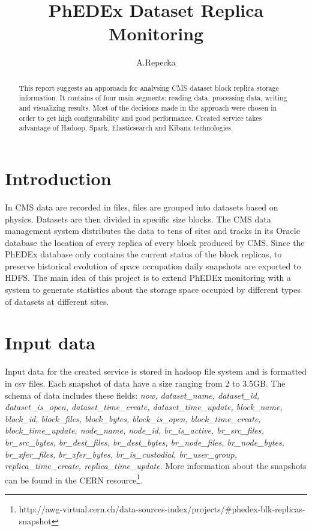 \title{PhEDEx Dataset Replica Monitoring}
\author{A.Repecka}
\maketitle

\begin{abstract}
This report suggests an apporoach for analysing CMS dataset block replica storage information. It contains of four main segments: reading data, 
processing data, writing and visualizing results. Most of the decisions made in the approach were chosen in order to get high configurability and 
good performance. Created service takes advantage of Hadoop, Spark, Elasticsearch and Kibana technologies.
\end{abstract}

\section{Introduction}

In CMS data are recorded in files, files are grouped into datasets based on physics. Datasets are then divided in specific size blocks.
The CMS data management system distributes the data to tens of sites and tracks in its Oracle database the location of every replica of 
every block produced by CMS. Since the PhEDEx database only contains the current status of the block replicas, to preserve historical 
evolution of space occupation daily snapshots are exported to HDFS. The main idea of this project is to extend PhEDEx monitoring with a 
system to generate statistics about the storage space occupied by different types of datasets at different sites.

\section{Input data}

Input data for the created service is stored in hadoop file system and is formatted in csv files. Each snapshot of data have a size ranging 
from 2 to 3.5GB. The schema of data includes these fields:
\textit{now, dataset{\_}name, dataset{\_}id, dataset{\_}is{\_}open, dataset{\_}time{\_}create, dataset{\_}time{\_}update, block{\_}name, block{\_}id, 
block{\_}files, block{\_}bytes, block{\_}is{\_}open, block{\_}time{\_}create, block{\_}time{\_}update, node{\_}name, node{\_}id, br{\_}is{\_}active, 
br{\_}src{\_}files, br{\_}src{\_}bytes, br{\_}dest{\_}files, br{\_}dest{\_}bytes, br{\_}node{\_}files, br{\_}node{\_}bytes, br{\_}xfer{\_}files, br{\_}xfer{\_}bytes, 
br{\_}is{\_}custodial, br{\_}user{\_}group, replica{\_}time{\_}create, replica{\_}time{\_}update}. More information about the snapshots can be found 
in the CERN resource\footnote{http://awg-virtual.cern.ch/data-sources-index/projects/\#phedex-blk-replicas-snapshot}.

